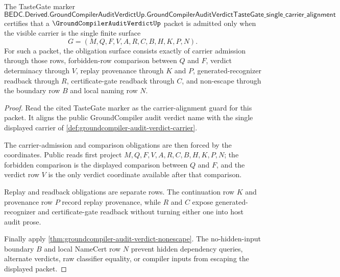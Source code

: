 \begin{theorem}
\label{thm:ground-compiler-audit-verdict-obligation-surface}
The TasteGate marker
$$
\mathsf{BEDC.Derived.GroundCompilerAuditVerdictUp.GroundCompilerAuditVerdictTasteGate\_single\_carrier\_alignment}
$$
certifies that a $\GroundCompilerAuditVerdictUp$ packet is admitted only when the visible carrier is the single finite surface
$$
G=(M,Q,F,V,A,R,C,B,H,K,P,N).
$$
For such a packet, the obligation surface consists exactly of carrier admission through those rows, forbidden-row comparison between $Q$ and $F$, verdict determinacy through $V$, replay provenance through $K$ and $P$, generated-recognizer readback through $R$, certificate-gate readback through $C$, and non-escape through the boundary row $B$ and local naming row $N$.
\end{theorem}
\begin{proof}
Read the cited TasteGate marker as the carrier-alignment guard for this packet. It aligns the public GroundCompiler audit verdict name with the single displayed carrier of \autoref{def:groundcompiler-audit-verdict-carrier}.

The carrier-admission and comparison obligations are then forced by the coordinates. Public reads first project $M,Q,F,V,A,R,C,B,H,K,P,N$; the forbidden comparison is the displayed comparison between $Q$ and $F$, and the verdict row $V$ is the only verdict coordinate available after that comparison.

Replay and readback obligations are separate rows. The continuation row $K$ and provenance row $P$ record replay provenance, while $R$ and $C$ expose generated-recognizer and certificate-gate readback without turning either one into host audit prose.

Finally apply \autoref{thm:groundcompiler-audit-verdict-nonescape}. The no-hidden-input boundary $B$ and local NameCert row $N$ prevent hidden dependency queries, alternate verdicts, raw classifier equality, or compiler inputs from escaping the displayed packet.
\end{proof}

